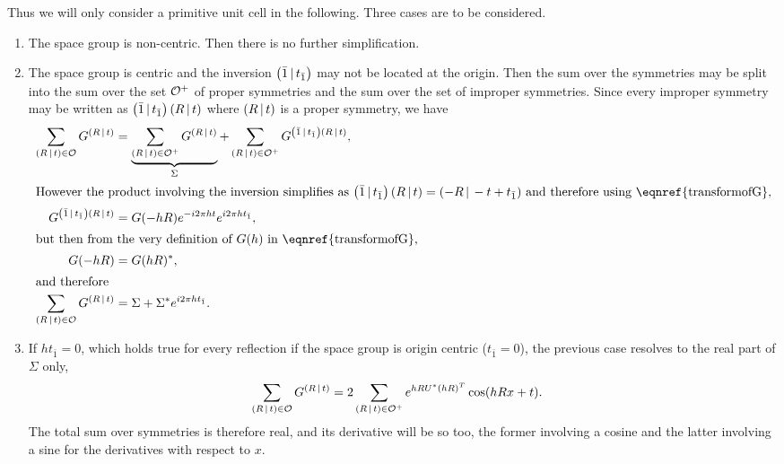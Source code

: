 \documentclass{iucr}
\begin{document}
Thus we will only consider a primitive unit cell in the following. Three cases are to be considered.
\begin{enumerate}
\item The space group is non-centric. Then there is no further simplification.
\item The space group is centric and the inversion $\left( \bar{1}\,\vert\, t_{\bar{1}} \right)$ may not be located at the origin. Then the sum over the symmetries may be split into the sum over the set $\cal{O}^+$ of proper symmetries and the sum over the set of  improper symmetries. Since every improper symmetry may be written as $\left( \bar{1}\,\vert\, t_{\bar{1}} \right)\left( R\,\vert\, t \right)$ where $\left( R\,\vert\, t \right)$ is a proper symmetry, we have
\begin{align}
\sum_{\sym{R}{t} \in \cal{O}} G^{\sym{R}{t}} &= 
\underbrace{\sum_{\sym{R}{t} \in \cal{O^+}} G^{\sym{R}{t}} }_{\Sigma} 
+ \sum_{\sym{R}{t} \in \cal{O}^+} G^{\inversion \sym{R}{t}}, \nonumber \\
\intertext{However the product involving the inversion simplifies as 
$\inversion\sym{R}{t} = \sym{-R}{-t + t_{\bar{1}}}$ and therefore using \eqnref{transformofG},}
G^{\inversion\sym{R}{t}} &= G(-hR) e^{-i2\pi ht} e^{i2\pi h t_{\bar{1}}}, \nonumber \\
 \intertext{but then from the very definition of $G(h)$ in \eqnref{transformofG},}
 G(-hR) &= G(hR)^*, \\
 \intertext{and therefore}
 \sum_{\sym{R}{t} \in \cal{O}} G^{\sym{R}{t}} &= \Sigma + \Sigma^* e^{i2\pi h t_{\bar{1}}}.
 \label{eqn:sumofGforcentricgroups}
\end{align}

\item If $h t_{\bar{1}}=0$, which holds true for every reflection if the space group is origin centric ($t_{\bar{1}}=0$), the previous case resolves to the real part of $\Sigma$ only,
\begin{align}
 \sum_{\left( R\,\vert\, t \right) \in \cal{O}} G^{\left( R\,\vert\, t \right)} & = 2 \sum_{\left( R\,\vert\, t \right) \in \cal{O}^+}  e^{h R U^* (hR)^T} \cos(hRx + t).
\end{align}
The total sum over symmetries is therefore real, and its derivative will be so too, the former involving a cosine and the latter involving a sine for the derivatives with respect to $x$. 
\end{enumerate}
\end{document}
